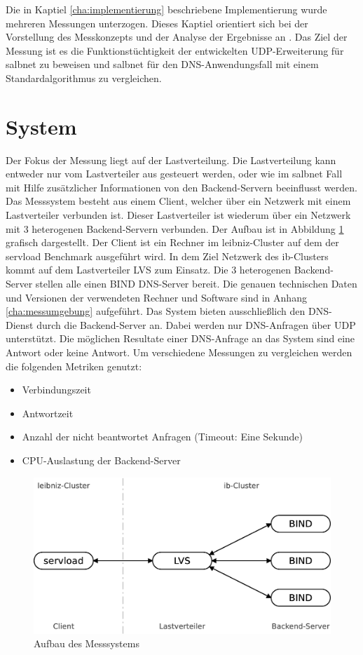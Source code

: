 \documentclass[a4paper, 12pt, BCOR10mm, DIV12, toc=bibliography, toc=listof, german]{scrbook}
\begin{document}
		Die in Kaptiel \ref{cha:implementierung} beschriebene Implementierung wurde mehreren Messungen
		unterzogen. Dieses Kaptiel orientiert sich bei der Vorstellung des Messkonzepts und der Analyse
		der Ergebnisse an \cite{jain1991}. Das Ziel der Messung ist es die Funktionstüchtigkeit der
		entwickelten UDP-Erweiterung für salbnet zu beweisen und salbnet für den DNS-Anwendungsfall mit
		einem Standardalgorithmus zu vergleichen.

		\section{System} %
		\label{sec:system}

		Der Fokus der Messung liegt auf der Lastverteilung. Die Lastverteilung kann entweder nur vom
		Lastverteiler aus gesteuert werden, oder wie im salbnet Fall mit Hilfe zusätzlicher
		Informationen von den Backend-Servern beeinflusst werden. Das Messsystem besteht aus einem
		Client, welcher über ein Netzwerk mit einem Lastverteiler verbunden ist. Dieser Lastverteiler
		ist wiederum über ein Netzwerk mit 3 heterogenen Backend-Servern verbunden. Der Aufbau ist in
		Abbildung \ref{fig:messsystem} grafisch dargestellt. Der Client ist ein Rechner im
		leibniz-Cluster auf dem der servload Benchmark \cite{menski2012} ausgeführt wird. In dem Ziel
		Netzwerk des ib-Clusters kommt auf dem Lastverteiler LVS zum Einsatz. Die 3 heterogenen
		Backend-Server stellen alle einen BIND DNS-Server bereit. Die genauen technischen Daten und
		Versionen der verwendeten Rechner und Software sind in Anhang \ref{cha:messumgebung} aufgeführt.
		Das System bieten ausschließlich den DNS-Dienst durch die Backend-Server an. Dabei werden nur
		DNS-Anfragen über UDP unterstützt. Die möglichen Resultate einer DNS-Anfrage an das System sind
		eine Antwort oder keine Antwort. Um verschiedene Messungen zu vergleichen werden die folgenden
		Metriken genutzt:

		\begin{itemize}
			\item Verbindungszeit
			\item Antwortzeit
			\item Anzahl der nicht beantwortet Anfragen (Timeout: Eine Sekunde)
			\item CPU-Auslastung der Backend-Server
		\end{itemize}

		\begin{figure}
			\centering
			\includegraphics[width=12cm]{images/test-system}
			\caption{Aufbau des Messsystems}
			\label{fig:messsystem}
		\end{figure}
\end{document}
